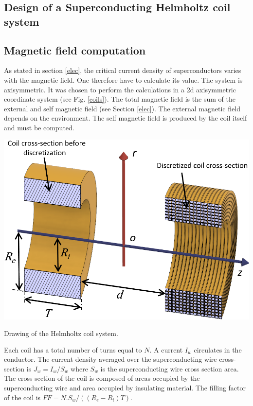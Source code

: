\documentclass{ws-jmrr}
\begin{document}
\begin{multicols}{2}
\section{Design of a Superconducting Helmholtz coil system}
\subsection{Magnetic field computation}
As stated in section \ref{elec}, the critical current density of superconductors varies with the magnetic field. One therefore have to calculate its value. The system is axisymmetric. It was chosen to perform the calculations in a 2d axisymmetric coordinate system (see Fig. \ref{coils}). The total magnetic field is the sum of the external and self magnetic field (see Section \ref{elec}). The external magnetic field depends on the environment. The self magnetic field is produced by the coil itself and must be computed.\par
\begin{figurehere}
	\begin{center}
	\includegraphics[width=\linewidth]{coil_system.png}
	\caption{Drawing of the Helmholtz coil system.}
	\label{coils}
	\end{center}
\end{figurehere}
Each coil has a total number of turns equal to $N$. A current $I_w$ circulates in the conductor. The current density averaged over the superconducting wire cross-section is $J_w=I_w/S_w$ where $S_w$ is the superconducting wire cross section area. The cross-section of the coil is composed of areas occupied by the superconducting wire and area occupied by insulating material. The filling factor of the coil is $FF=N.S_w/((R_e-R_i)T)$.\par

\end{multicols}
\end{document}
